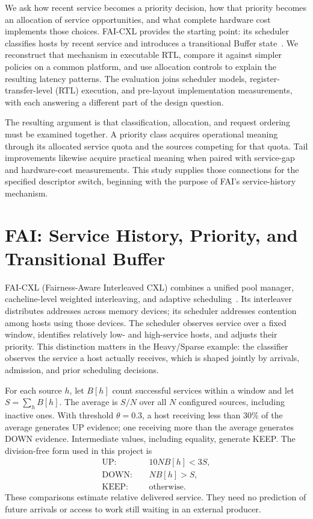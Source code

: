 We ask how recent service becomes a priority decision, how that priority becomes an allocation of service opportunities, and what complete hardware cost implements those choices. FAI-CXL provides the starting point: its scheduler classifies hosts by recent service and introduces a transitional Buffer state~\cite{fai}. We reconstruct that mechanism in executable RTL, compare it against simpler policies on a common platform, and use allocation controls to explain the resulting latency patterns. The evaluation joins scheduler models, register-transfer-level (RTL) execution, and pre-layout implementation measurements, with each answering a different part of the design question.

The resulting argument is that classification, allocation, and request ordering must be examined together. A priority class acquires operational meaning through its allocated service quota and the sources competing for that quota. Tail improvements likewise acquire practical meaning when paired with service-gap and hardware-cost measurements. This study supplies those connections for the specified descriptor switch, beginning with the purpose of FAI's service-history mechanism.

\section{FAI: Service History, Priority, and Transitional Buffer}
\label{sec:fai}
FAI-CXL (Fairness-Aware Interleaved CXL) combines a unified pool manager, cacheline-level weighted interleaving, and adaptive scheduling~\cite{fai}. Its interleaver distributes addresses across memory devices; its scheduler addresses contention among hosts using those devices. The scheduler observes service over a fixed window, identifies relatively low- and high-service hosts, and adjusts their priority. This distinction matters in the Heavy/Sparse example: the classifier observes the service a host actually receives, which is shaped jointly by arrivals, admission, and prior scheduling decisions.

For each source $h$, let $B[h]$ count successful services within a window and let $S=\sum_h B[h]$. The average is $S/N$ over all $N$ configured sources, including inactive ones. With threshold $\theta=0.3$, a host receiving less than 30\% of the average generates UP evidence; one receiving more than the average generates DOWN evidence. Intermediate values, including equality, generate KEEP. The division-free form used in this project is
\begin{align}
\mathrm{UP}:&\quad 10NB[h]<3S,\nonumber\\
\mathrm{DOWN}:&\quad NB[h]>S,\label{eq:class-v3}\\
\mathrm{KEEP}:&\quad\text{otherwise}.\nonumber
\end{align}
These comparisons estimate relative delivered service. They need no prediction of future arrivals or access to work still waiting in an external producer.

